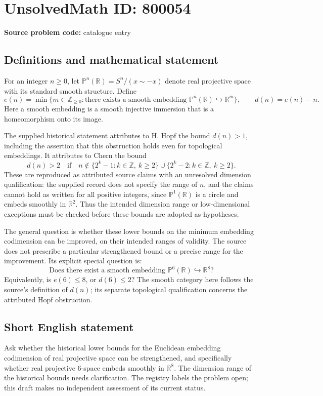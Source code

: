 \documentclass[11pt]{article}
\newcommand{\Z}{\mathbb{Z}}
\newcommand{\R}{\mathbb{R}}
\begin{document}
\section*{UnsolvedMath ID: 800054}
\textbf{Source problem code:} catalogue entry
\subsection{Definitions and mathematical statement}
For an integer \(n\geq 0\), let \(\mathbb{P}^{n}(\R)=S^{n}/(x\sim -x)\) denote real projective space with its standard smooth structure. Define
\[
e(n)=\min\{m\in\Z_{\geq 0}:\text{there exists a smooth embedding }\mathbb{P}^{n}(\R)\hookrightarrow\R^{m}\},\qquad d(n)=e(n)-n.
\]
Here a smooth embedding is a smooth injective immersion that is a homeomorphism onto its image.

The supplied historical statement attributes to H. Hopf the bound \(d(n)>1\), including the assertion that this obstruction holds even for topological embeddings. It attributes to Chern the bound
\[
d(n)>2\quad\text{if}\quad n\notin\{2^{k}-1:k\in\Z,\ k\geq2\}\cup\{2^{k}-2:k\in\Z,\ k\geq2\}.
\]
These are reproduced as attributed source claims with an unresolved dimension qualification: the supplied record does not specify the range of \(n\), and the claims cannot hold as written for all positive integers, since \(\mathbb{P}^{1}(\R)\) is a circle and embeds smoothly in \(\R^{2}\). Thus the intended dimension range or low-dimensional exceptions must be checked before these bounds are adopted as hypotheses.

The general question is whether these lower bounds on the minimum embedding codimension can be improved, on their intended ranges of validity. The source does not prescribe a particular strengthened bound or a precise range for the improvement. Its explicit special question is:
\[
\text{Does there exist a smooth embedding }\mathbb{P}^{6}(\R)\hookrightarrow\R^{8}\text{?}
\]
Equivalently, is \(e(6)\leq8\), or \(d(6)\leq2\)? The smooth category here follows the source's definition of \(d(n)\); its separate topological qualification concerns the attributed Hopf obstruction.
\subsection{Short English statement}
Ask whether the historical lower bounds for the Euclidean embedding codimension of real projective space can be strengthened, and specifically whether real projective \(6\)-space embeds smoothly in \(\R^{8}\). The dimension range of the historical bounds needs clarification. The registry labels the problem open; this draft makes no independent assessment of its current status.
\end{document}
